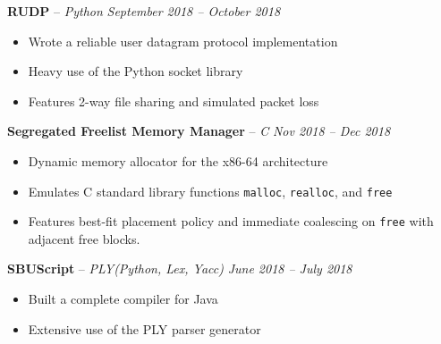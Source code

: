 \documentclass[10pt,letterpaper]{article}
\begin{document}
										
\headedsection 
{\textbf{RUDP} -- \textit{Python}}
{\textit{September 2018 -- October 2018}} {
	\begin{itemize}[noitemsep,nolistsep]
		\item Wrote a reliable user datagram protocol implementation
		\item Heavy use of the Python socket library
		\item Features 2-way file sharing and simulated packet loss
	\end{itemize}
}	


\headedsection 
{\textbf{Segregated Freelist Memory Manager} -- \textit{C}}
{\textit{Nov 2018 -- Dec 2018}} {
	\begin{itemize}[noitemsep,nolistsep]
		\item Dynamic memory allocator for the x86-64 architecture
		\item Emulates C standard library functions \texttt{malloc}, \texttt{realloc}, and \texttt{free}
		\item Features best-fit placement policy and immediate coalescing on \texttt{free} with adjacent free blocks.	      		      		      		      		
	\end{itemize}
}
										

\headedsection 
{\textbf{SBUScript} -- \textit{PLY(Python, Lex, Yacc)}}
{\textit{June 2018 -- July 2018}} {
	\begin{itemize}[noitemsep,nolistsep]
		\item Built a complete compiler for Java
		\item Extensive use of the PLY parser generator
	\end{itemize}
}
										
\spacedhrule{0.3em}{-0.6em} 
\end{document}
